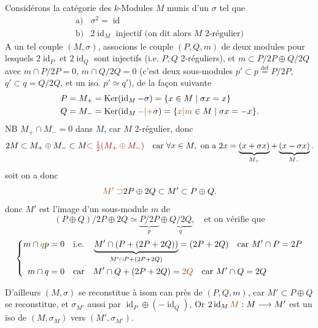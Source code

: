 Considérons la catégorie des $k$-Modules
$M$ munis d'un  $\sigma$ 
tel que
\[
\begin{array}{ll}
\text{a)}&\sigma^2=\operatorname{id}\\
\text{b)}&2\operatorname{id}_M\text{ injectif (on dit alors }M\text{ 2-régulier)}
\end{array}
\]
A un tel couple $(M,\sigma)$,  associons le couple
$(P,Q,m)$ de deux modules pour lesquels $2\operatorname{id}_P$ et $2\operatorname{id}_Q$
sont injectifs (i.e. $P,Q$ 2-réguliers), et
$m\subset P/2P\oplus Q/2Q$  avec
$m\cap P/2P=0$, $m\cap Q/2Q=0$
(c'est deux sous-modules $p'\subset p\overset{\mathrm{def}}=P/2P$, $q'\subset q=Q/2Q$,
et un iso. $p'\simeq q'$), de la façon suivante
\[
\begin{aligned}
P=M_+&=\operatorname{Ker}(\operatorname{id}_M-\sigma)=\{x\in M\mid\sigma x=x\}\\
Q=M_-&=\operatorname{Ker}(\operatorname{id}_M\unsure{-|+}\sigma)=\{\unsure{x|m}\in M\mid\sigma x=-x\}.
\end{aligned}
\]
NB $M_+\cap M_-=0$ dans $M$, car $M$ 2-régulier, donc
\margin{!}
\[
2M\subset M_+\oplus M_-\subset M\deleted{\subset\tfrac12(M_+\oplus M_-)}
\quad\text{car }\forall x\in M,\text{ on a }2x=\underbrace{(x+\sigma x)}_{M_+}+\underbrace{(x-\sigma x)}_{M_-}.
\]
soit
on a donc
\[
\deleted{\unsure{M'\supset}}2P\oplus2Q\subset M'\subset P\oplus Q.
\]
donc $M'$ est l'image d'un sous-module $m$ de
\[
(P\oplus Q)/2P\oplus2Q\simeq\underbrace{P/2P}_p\oplus\underbrace{Q/2Q}_q,
\quad\text{et on vérifie que}
\]
\[
\left\{\begin{aligned}
m\cap\deleted{\unsure{q}}p&=0\quad\text{i.e.}\quad
\underbrace{M'\cap(P+(2P+2Q))}_{M'\cap P+(2P+2Q)}=(2P+2Q)\quad\text{car }M'\cap P=2P\\
m\cap q&=0\quad\text{car}\quad M'\cap Q+(2P+2Q)=\unsure{2Q}\quad\text{car }M'\cap Q=2Q
\end{aligned}\right.
\]

D'ailleurs  $(M,\sigma)$ se reconstitue à isom can près de
$(P,Q,m)$, car $M'\subset P\oplus Q$ se reconstitue, et
$\sigma_{M'}$ aussi  par $\operatorname{id}_P\oplus(-\operatorname{id}_Q)$,
Or $2\operatorname{id}_M\deleted{\unsure{M}}:M\longrightarrow M'$ est un iso de $(M,\sigma_M)$ vers $(M',\sigma_{M'})$.

